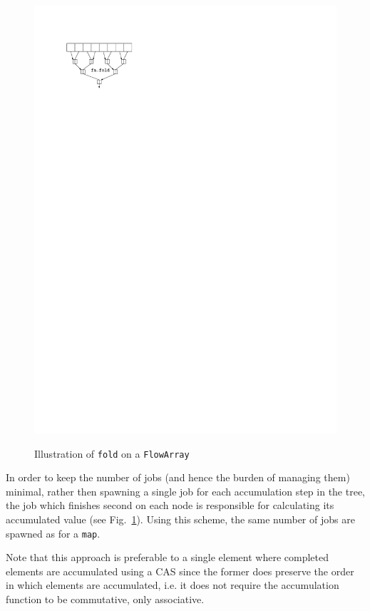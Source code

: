 \documentclass[runningheads,a4paper,fleqn]{llncs}
\begin{document}
\begin{figure}
{    \includegraphics{fa-fold-calc}%
    \label{fig:fa-fold-calc}}
  \caption{Illustration of \texttt{fold} on a \texttt{FlowArray}}
\end{figure}

In order to keep the number of jobs (and hence the burden of managing
them) minimal, rather then spawning a single job for each accumulation
step in the tree, the job which finishes second on each node is
responsible for calculating its accumulated value (see
Fig.~\ref{fig:fa-fold-calc}). Using this scheme, the 
same number of jobs are spawned as for a \texttt{map}.

Note that this approach is preferable to a single element where
completed elements are accumulated using a CAS since the former
does preserve the order in which elements are accumulated, i.e. it
does not require the accumulation function to be commutative, only
associative.
\end{document}
